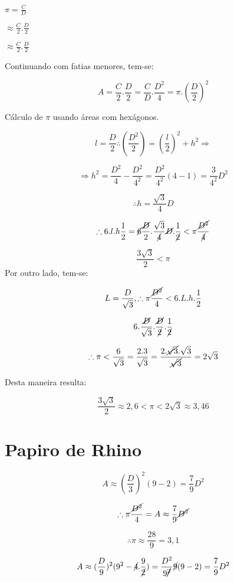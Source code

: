 \documentclass[a4paper, 12pt]{article}
\begin{document}
$\pi = \frac{C}{D}$

$\approx\frac{C}{2}.\frac{D}{2}$

$\approx\frac{C}{2}.\frac{D}{2}$

Continuando com fatias menores, tem-se:

\[A = \frac{C}{2}.\frac{D}{2} = \frac{C}{D}.\frac{D^2}{4} = \pi.(\frac{D}{2})^2\]

Cálculo de $\pi$ usando áreas com hexágonos.

\[l = \frac{D}{2} \therefore (\frac{D^2}{2}) = (\frac{l}{2})^2 + h^2 \Rightarrow \]

\[\Rightarrow h^2 = \frac{D^2}{4} - \frac{D^2}{4^2} = \frac{D^2}{4^2} (4-1) = \frac{3}{4^2}D^2\]

\[\therefore h= \frac{\sqrt{3}}{4}D\]

\[\therefore 6.l.h\frac{1}{2} = \cancel{6} \frac{\cancel{D}}{2}.\frac{\sqrt{3}}{\cancel{4}}\cancel{D}.\frac{1}{\cancel{2}} <\pi\frac{\cancel{D^2}}{\cancel{4}}\]

\[\frac{3\sqrt{3}}{2} < \pi\]
Por outro lado, tem-se:

\[L= \frac{D}{\sqrt{3}}, \therefore \pi \frac{\cancel{D^2}}{4} < 6.L.h.\frac{1}{2}\]

\[6.\frac{\cancel{D}}{\sqrt{3}}.\frac{\cancel{D}}{\cancel{2}}.\frac{1}{\cancel{2}}\]

\[\therefore \pi < \frac{6}{\sqrt{3}} = \frac{2.3}{\sqrt{3}} = \frac{2.\cancel{\sqrt{3}}.\sqrt{3}}{\cancel{\sqrt{3}}} = 2\sqrt{3}\]

Desta maneira resulta:

\[\frac{3\sqrt{3}}{2} \approx 2,6 < \pi < 2\sqrt{3} \approx 3,46\]

\newpage

\section{Papiro de Rhino}

\[A \approx (\frac{D}{3})^2 (9-2) = \frac{7}{9}D^2\]

\[\therefore \pi \frac{\cancel{D^2}}{4} = A \approx \frac{7}{9} \cancel{D^2}\]

\[\therefore \pi \approx \frac{28}{9} = 3,1\]

\[A \approx (\frac{D}{9})^2(9^2 - \cancel{4}.\frac{9}{\cancel{2}}) = \frac{D^2}{9\cancel{^2}}\cancel{9}(9-2) = \frac{7}{9}D^2\]
\end{document}
